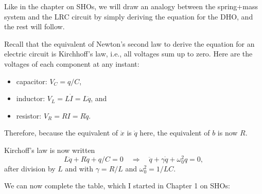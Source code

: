 \documentclass[11pt]{article}
\providecommand{\tightlist}{%
      \setlength{\itemsep}{0pt}\setlength{\parskip}{0pt}}
\begin{document}
    Like in the chapter on SHOs, we will draw an analogy between the
spring+mass system and the LRC circuit by simply deriving the equation
for the DHO, and the rest will follow.

Recall that the equivalent of Newton's second law to derive the equation
for an electric circuit is Kirchhoff's law, i.e., all voltages sum up to
zero. Here are the voltages of each component at any instant:

\begin{itemize}
\tightlist
\item
  capacitor: \(V_C = q/C\),
\item
  inductor: \(V_L = L\dot I = L\ddot q\), and
\item
  resistor: \(V_R = RI = R\dot q\).
\end{itemize}

Therefore, because the equivalent of \(\dot x\) is \(\dot q\) here, the
equivalent of \(b\) is now \(R\).

    Kirchoff's law is now written
\[ L\ddot q + R\dot q + q/C = 0 \quad \Rightarrow \quad \ddot q + \gamma\dot q + \omega_0^2 q = 0, \]
after division by \(L\) and with \(\gamma = R/L\) and
\(\omega_0^2 = 1/LC\).

    We can now complete the table, which I started in Chapter 1 on SHOs:
\end{document}
